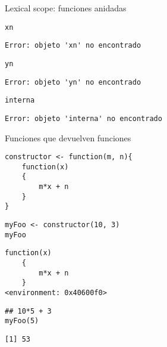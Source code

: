 \documentclass[xcolor={usenames,svgnames,dvipsnames}]{beamer}
\begin{document}
\begin{frame}[fragile,label={sec:orgheadline16}]{Lexical scope: funciones anidadas}
 \lstset{language=R,label= ,caption= ,captionpos=b,numbers=none}
\begin{lstlisting}
xn
\end{lstlisting}

\begin{verbatim}
Error: objeto 'xn' no encontrado
\end{verbatim}

\lstset{language=R,label= ,caption= ,captionpos=b,numbers=none}
\begin{lstlisting}
yn
\end{lstlisting}

\begin{verbatim}
Error: objeto 'yn' no encontrado
\end{verbatim}

\lstset{language=R,label= ,caption= ,captionpos=b,numbers=none}
\begin{lstlisting}
interna
\end{lstlisting}

\begin{verbatim}
Error: objeto 'interna' no encontrado
\end{verbatim}
\end{frame}

\begin{frame}[fragile,label={sec:orgheadline17}]{Funciones que devuelven funciones}
 \lstset{language=R,label= ,caption= ,captionpos=b,numbers=none}
\begin{lstlisting}
constructor <- function(m, n){
    function(x)
    {
        m*x + n
    }
}
\end{lstlisting}

\lstset{language=R,label= ,caption= ,captionpos=b,numbers=none}
\begin{lstlisting}
myFoo <- constructor(10, 3)
myFoo
\end{lstlisting}

\begin{verbatim}
function(x)
    {
        m*x + n
    }
<environment: 0x40600f0>
\end{verbatim}

\lstset{language=R,label= ,caption= ,captionpos=b,numbers=none}
\begin{lstlisting}
## 10*5 + 3
myFoo(5)
\end{lstlisting}

\begin{verbatim}
[1] 53
\end{verbatim}
\end{frame}
\end{document}

